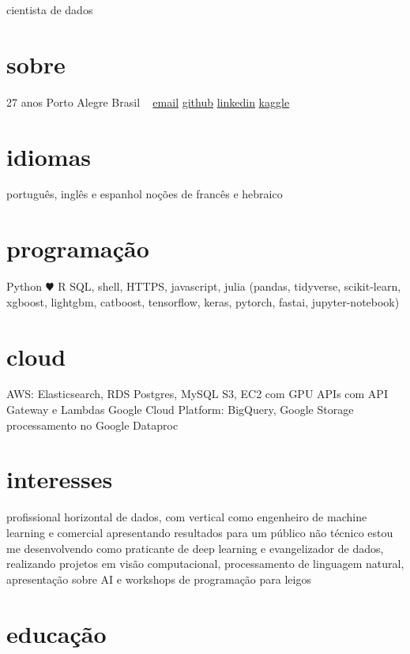 \documentclass[]{friggeri-cv}
\begin{document}
       {cientista de dados}


\begin{aside}
  \section{sobre}
    27 anos
    Porto Alegre
    Brasil
    ~
    \href{mailto:jt\_anchante@hotmail.com}{email}
    \href{https://github.com/jayme-anchante/}{github}
    \href{https://www.linkedin.com/in/jayme-anchante}{linkedin}
    \href{https://www.kaggle.com/jaymeanchante}{kaggle}
  \section{idiomas}
    português, inglês e espanhol
    noções de francês e hebraico
  \section{programação}
    Python {\color{red} $\varheartsuit$} R
    SQL, shell, HTTPS,
    javascript, julia
    (pandas, tidyverse,
    scikit-learn, xgboost,
    lightgbm, catboost,
    tensorflow, keras,
    pytorch, fastai,
    jupyter-notebook)
  \section{cloud}
    AWS:
    Elasticsearch, RDS Postgres, MySQL
    S3, EC2 com GPU
    APIs com API Gateway e Lambdas
    Google Cloud Platform:
    BigQuery, Google Storage
    processamento no Google Dataproc
\end{aside}

\section{interesses}

profissional horizontal de dados, com vertical como engenheiro de machine learning
e comercial apresentando resultados para um público não técnico
estou me desenvolvendo como praticante de deep learning e evangelizador de dados,
realizando projetos em visão computacional, processamento de linguagem natural,
apresentação sobre AI e workshops de programação para leigos

\section{educação}
\end{document}
